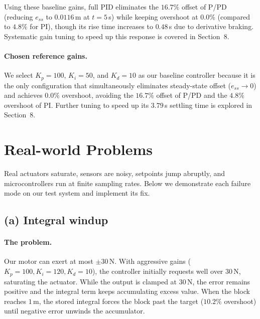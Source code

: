 \documentclass[10pt]{article}
\begin{document}
	Using these baseline gains, full PID eliminates the $16.7\%$ offset of P/PD (reducing $e_{ss}$ to $0.0116$\,m at $t=5$\,s) while keeping overshoot at $0.0\%$ (compared to $4.8\%$ for PI), though its rise time increases to $0.48$\,s due to derivative braking. Systematic gain tuning to speed up this response is covered in Section~8.
	
	
	\paragraph{Chosen reference gains.}
	We select $K_p = 100$, $K_i = 50$, and $K_d = 10$ as our baseline controller because it is the only configuration that simultaneously eliminates steady-state offset ($e_{ss} \to 0$) and achieves $0.0\%$ overshoot, avoiding the $16.7\%$ offset of P/PD and the $4.8\%$ overshoot of PI. Further tuning to speed up its $3.79$\,s settling time is explored in Section~8.
	
	\section{Real-world Problems}
	Real actuators saturate, sensors are noisy, setpoints jump abruptly, and microcontrollers run at finite sampling rates. Below we demonstrate each failure mode on our test system and implement its fix.
	
	\subsection{(a) Integral windup}
	\paragraph{The problem.}
	Our motor can exert at most $\pm 30$\,N. With aggressive gains ($K_p = 100, K_i = 120, K_d = 10$), the controller initially requests well over $30$\,N, saturating the actuator. While the output is clamped at $30$\,N, the error remains positive and the integral term keeps accumulating excess value. When the block reaches $1$\,m, the stored integral forces the block past the target ($10.2\%$ overshoot) until negative error unwinds the accumulator.
	
\end{document}
